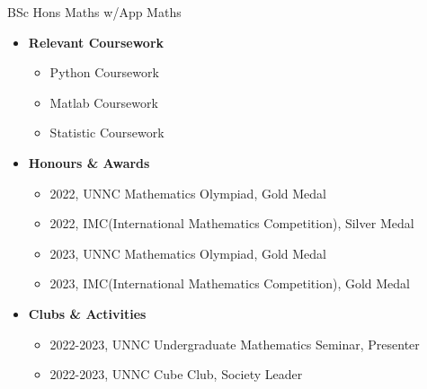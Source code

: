 \documentclass{article}
\begin{document}
\noindent BSc Hons Maths w/App Maths
\begin{itemize}
    \item \textbf{Relevant Coursework}
    \begin{itemize}
        \item Python Coursework
        \item Matlab Coursework
        \item Statistic Coursework
    \end{itemize}
    \item \textbf{Honours \& Awards}
    \begin{itemize}
        \item 2022, UNNC Mathematics Olympiad, Gold Medal
        \item 2022, IMC(International Mathematics Competition), Silver Medal
        \item 2023, UNNC Mathematics Olympiad, Gold Medal
        \item 2023, IMC(International Mathematics Competition), Gold Medal
    \end{itemize}
    \item \textbf{Clubs \& Activities}
    \begin{itemize}
        \item 2022-2023, UNNC Undergraduate Mathematics Seminar, Presenter
        \item 2022-2023, UNNC Cube Club, Society Leader
    \end{itemize}
\end{itemize}
\end{document}
